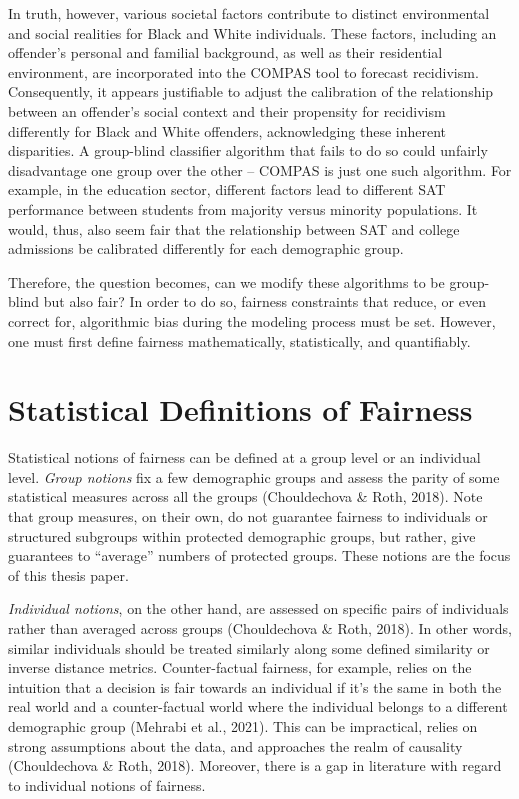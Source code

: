 \documentclass[12pt, twoside]{amherstthesis}
\begin{document}
In truth, however, various societal factors contribute to distinct environmental and social realities for Black and White individuals. These factors, including an offender's personal and familial background, as well as their residential environment, are incorporated into the COMPAS tool to forecast recidivism. Consequently, it appears justifiable to adjust the calibration of the relationship between an offender's social context and their propensity for recidivism differently for Black and White offenders, acknowledging these inherent disparities. A group-blind classifier algorithm that fails to do so could unfairly disadvantage one group over the other -- COMPAS is just one such algorithm. For example, in the education sector, different factors lead to different SAT performance between students from majority versus minority populations. It would, thus, also seem fair that the relationship between SAT and college admissions be calibrated differently for each demographic group.

Therefore, the question becomes, can we modify these algorithms to be group-blind but also fair? In order to do so, fairness constraints that reduce, or even correct for, algorithmic bias during the modeling process must be set. However, one must first define fairness mathematically, statistically, and quantifiably.

\hypertarget{fairnessdefinitions}{%
\section{Statistical Definitions of Fairness}\label{fairnessdefinitions}}

Statistical notions of fairness can be defined at a group level or an individual level. \emph{Group notions} fix a few demographic groups and assess the parity of some statistical measures across all the groups (Chouldechova \& Roth, 2018). Note that group measures, on their own, do not guarantee fairness to individuals or structured subgroups within protected demographic groups, but rather, give guarantees to ``average'' numbers of protected groups. These notions are the focus of this thesis paper.

\emph{Individual notions}, on the other hand, are assessed on specific pairs of individuals rather than averaged across groups (Chouldechova \& Roth, 2018). In other words, similar individuals should be treated similarly along some defined similarity or inverse distance metrics. Counter-factual fairness, for example, relies on the intuition that a decision is fair towards an individual if it's the same in both the real world and a counter-factual world where the individual belongs to a different demographic group (Mehrabi et al., 2021). This can be impractical, relies on strong assumptions about the data, and approaches the realm of causality (Chouldechova \& Roth, 2018). Moreover, there is a gap in literature with regard to individual notions of fairness.
\end{document}
